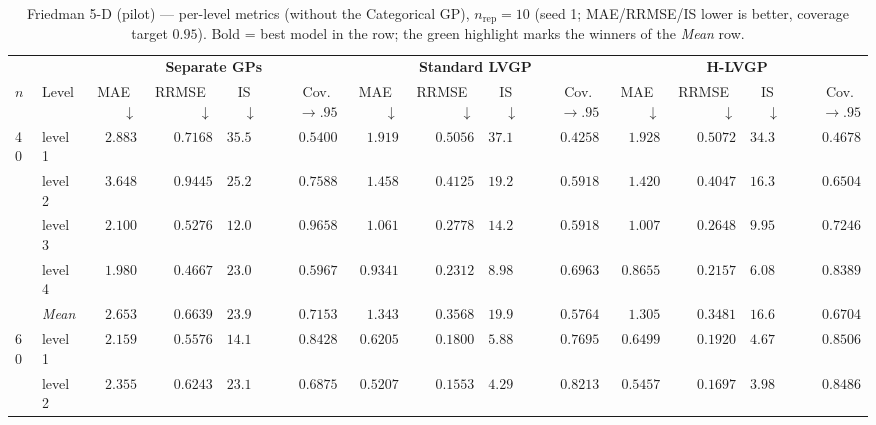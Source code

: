 \begin{table}[htbp]
\centering
\scriptsize
\setlength{\tabcolsep}{2.5pt}
\setlength{\fboxsep}{1pt}
\caption{Friedman 5-D (pilot) --- per-level metrics (without the Categorical GP), $n_{\mathrm{rep}}=10$ (seed 1; MAE/RRMSE/IS lower is better, coverage target $0.95$). Bold = best model in the row; the green highlight marks the winners of the \emph{Mean} row.}
\label{tab:friedman_5d_nrep10_nocat}
\begin{tabular}{llrrrrrrrrrrrr}
\toprule
 & & \multicolumn{4}{c}{\textbf{Separate GPs}} & \multicolumn{4}{c}{\textbf{Standard LVGP}} & \multicolumn{4}{c}{\textbf{H-LVGP}} \\
\cmidrule(lr){3-6} \cmidrule(lr){7-10} \cmidrule(lr){11-14}
$n$ & Level & MAE~$\downarrow$ & RRMSE~$\downarrow$ & IS~$\downarrow$ & Cov.~$\to.95$ & MAE~$\downarrow$ & RRMSE~$\downarrow$ & IS~$\downarrow$ & Cov.~$\to.95$ & MAE~$\downarrow$ & RRMSE~$\downarrow$ & IS~$\downarrow$ & Cov.~$\to.95$ \\
\midrule
\multirow{5}{*}{40} & level 1 & $2.883$ & $0.7168$ & $35.53$ & {\boldmath$0.5400$} & {\boldmath$1.919$} & {\boldmath$0.5056$} & $37.19$ & $0.4258$ & $1.928$ & $0.5072$ & {\boldmath$34.30$} & $0.4678$ \\
 & level 2 & $3.648$ & $0.9445$ & $25.21$ & {\boldmath$0.7588$} & $1.458$ & $0.4125$ & $19.22$ & $0.5918$ & {\boldmath$1.420$} & {\boldmath$0.4047$} & {\boldmath$16.31$} & $0.6504$ \\
 & level 3 & $2.100$ & $0.5276$ & $12.06$ & {\boldmath$0.9658$} & $1.061$ & $0.2778$ & $14.27$ & $0.5918$ & {\boldmath$1.007$} & {\boldmath$0.2648$} & {\boldmath$9.959$} & $0.7246$ \\
 & level 4 & $1.980$ & $0.4667$ & $23.02$ & $0.5967$ & $0.9341$ & $0.2312$ & $8.987$ & $0.6963$ & {\boldmath$0.8655$} & {\boldmath$0.2157$} & {\boldmath$6.081$} & {\boldmath$0.8389$} \\
 & \textit{Mean} & $2.653$ & $0.6639$ & $23.95$ & \colorbox{green!20}{\boldmath$0.7153$} & $1.343$ & $0.3568$ & $19.92$ & $0.5764$ & \colorbox{green!20}{\boldmath$1.305$} & \colorbox{green!20}{\boldmath$0.3481$} & \colorbox{green!20}{\boldmath$16.66$} & $0.6704$ \\
\midrule
\multirow{5}{*}{60} & level 1 & $2.159$ & $0.5576$ & $14.19$ & $0.8428$ & {\boldmath$0.6205$} & {\boldmath$0.1800$} & $5.883$ & $0.7695$ & $0.6499$ & $0.1920$ & {\boldmath$4.671$} & {\boldmath$0.8506$} \\
 & level 2 & $2.355$ & $0.6243$ & $23.10$ & $0.6875$ & {\boldmath$0.5207$} & {\boldmath$0.1553$} & $4.299$ & $0.8213$ & $0.5457$ & $0.1697$ & {\boldmath$3.986$} & {\boldmath$0.8486$} \\

\end{tabular}
\end{table}
